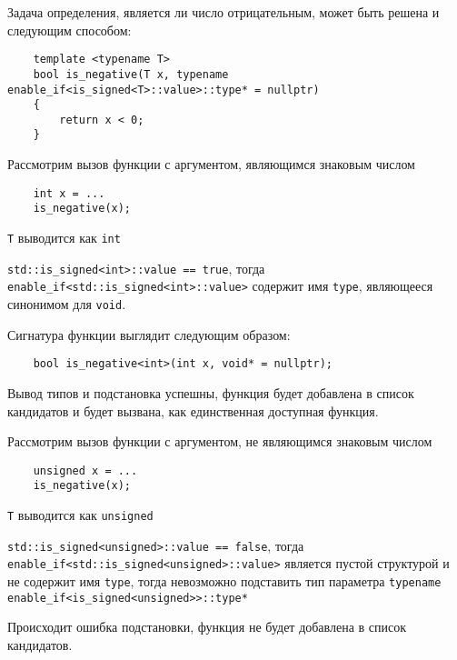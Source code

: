 	
	Задача определения, является ли число отрицательным, может быть решена и следующим способом:
	
	\begin{verbatim}
	template <typename T>
	bool is_negative(T x, typename enable_if<is_signed<T>::value>::type* = nullptr)
	{
		return x < 0;
	}
	\end{verbatim}
	
	Рассмотрим вызов функции с аргументом, являющимся знаковым числом
	
	\begin{verbatim}
	int x = ...
	is_negative(x);
	\end{verbatim}
	
	\texttt{T} выводится как \texttt{int}
	
	\texttt{std::is_signed<int>::value == true}, тогда \texttt{enable_if<std::is_signed<int>::value>} содержит имя \texttt{type}, являющееся синонимом для \texttt{void}.
	
	Сигнатура функции выглядит следующим образом:
	
	\begin{verbatim}
	bool is_negative<int>(int x, void* = nullptr);
	\end{verbatim}
	
	Вывод типов и подстановка успешны, функция будет добавлена в список кандидатов и будет вызвана, как единственная доступная функция.
	
	Рассмотрим вызов функции с аргументом, не являющимся знаковым числом
	
	\begin{verbatim}
	unsigned x = ...
	is_negative(x);
	\end{verbatim}
	
	\texttt{T} выводится как \texttt{unsigned}
	
	\texttt{std::is_signed<unsigned>::value == false}, тогда \texttt{enable_if<std::is_signed<unsigned>::value>} является пустой структурой и не содержит имя \texttt{type}, тогда невозможно подставить тип параметра \texttt{typename enable_if<is_signed<unsigned>>::type*}
	
	Происходит ошибка подстановки, функция не будет добавлена в список кандидатов.
	
